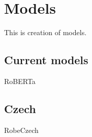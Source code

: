\chapter{Models}
This is creation of models.

\section{Current models}
RoBERTa
\section{Czech}
RobeCzech \cite{thorne2019fever2}